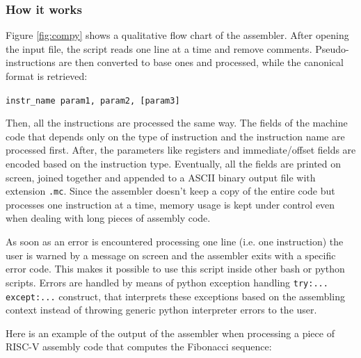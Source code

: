 \subsubsection{How it works}
Figure \ref{fig:compy} shows a qualitative flow chart of the assembler. After opening the input file, the script reads one line at a time and remove comments. Pseudo-instructions are then converted to base ones and processed, while the canonical format is retrieved:
\begin{center}
   \texttt{instr\_name param1, param2, [param3]} 
\end{center}
Then, all the instructions are processed the same way. The fields of the machine code that depends only on the type of instruction and the instruction name are processed first. After, the parameters like registers and immediate/offset fields are encoded based on the instruction type. Eventually, all the fields are printed on screen, joined together and appended to a ASCII binary output file with extension \texttt{.mc}. Since the assembler doesn't keep a copy of the entire code but processes one instruction at a time, memory usage is kept under control even when dealing with long pieces of assembly code. 

As soon as an error is encountered processing one line (i.e. one instruction) the user is warned by a message on screen and the assembler exits with a specific error code. This makes it possible to use this script inside other bash or python scripts. Errors are handled by means of python exception handling \texttt{try:... except:...} construct, that interprets these exceptions based on the assembling context instead of throwing generic python interpreter errors to the user. 

Here is an example of the output of the assembler when processing a piece of RISC-V assembly code that computes the Fibonacci sequence:

